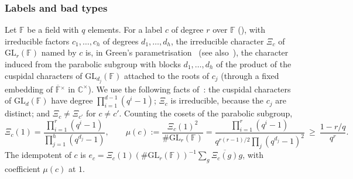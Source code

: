 \documentclass[10pt]{amsart}
\theoremstyle{definition}
\theoremstyle{remark}
\newcommand{\C}{\mathbb C}
\providecommand{\auF}{\mathbb F}
\providecommand{\auGL}{\mathrm{GL}}
\providecommand{\aubar}[1]{\overline{#1}}
\begin{document}
\subsubsection*{Labels and bad types}
Let $\auF$ be a field with $q$ elements. For a label $c$ of degree $r$ over $\auF$
({\cite[\S14.3]{P46}}), with irreducible factors $c_1,\dots,c_h$ of degrees $d_1,\dots,d_h$, the
irreducible character $\Xi_c$ of $\auGL_r(\auF)$ named by $c$ is, in Green's
parametrisation~\cite[p.~403 and Thm.~13]{Green1955} (see also~\cite[Ch.~IV, (6.7)--(6.8)]{Macdonald}), the character induced from the
parabolic subgroup with blocks $d_1,\dots,d_h$ of the product of the cuspidal characters of
$\auGL_{d_j}(\auF)$ attached to the roots of $c_j$ (through a fixed embedding of $\overline{\auF}{}^
\times$ in $\C^\times$). We use the following facts of~\cite[Lemma~7.4 and Thms.~12--13]{Green1955}: the cuspidal characters of
$\auGL_d(\auF)$ have degree $\prod_{i=1}^{d-1}(q^i-1)$; $\Xi_c$ is irreducible, because the
$c_j$ are distinct; and $\Xi_c\ne\Xi_{c'}$ for $c\ne c'$. Counting the cosets of the parabolic
subgroup,
\begin{equation}\label{pb:eq-green}
\Xi_c(1)=\frac{\prod_{i=1}^r(q^i-1)}{\prod_{j=1}^h(q^{d_j}-1)} ,\qquad\mu(c):=\frac{\Xi_c(1)^2}{\#
\auGL_r(\auF)}=\frac{\prod_{i=1}^r(q^i-1)}{q^{r(r-1)/2}\prod_j(q^{d_j}-1)^2}\ \ge\ \frac{1-r/q}{
q^r} .
\end{equation}
The idempotent of $c$ is $e_c=\Xi_c(1)(\#\auGL_r(\auF))^{-1}\sum_g\aubar{\Xi_c(g)}g$, with
coefficient $\mu(c)$ at $1$.
\end{document}
